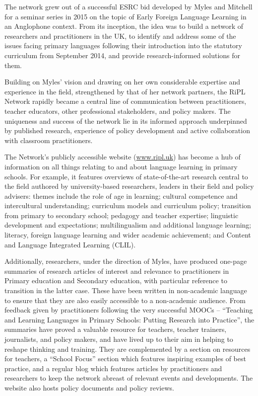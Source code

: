 \documentclass[output=paper]{langscibook}
\begin{document}
The network grew out of a successful ESRC bid developed by Myles and Mitchell for a seminar series in 2015 on the topic of Early Foreign Language Learning in an Anglophone context. From its inception, the idea was to build a network of researchers and practitioners in the UK, to identify and address some of the issues facing primary languages following their introduction into the statutory curriculum from September 2014, and provide research-informed solutions for them. 

Building on Myles’ vision and drawing on her own considerable expertise and experience in the field, strengthened by that of her network partners, the RiPL Network rapidly became a central line of communication between practitioners, teacher educators, other professional stakeholders, and policy makers. The uniqueness and success of the network lie in its informed approach underpinned by published research, experience of policy development and active collaboration with classroom practitioners. 

The Network’s publicly accessible website (\href{http://www.ripl.uk/}{www.ripl.uk}) has become a hub of information on all things relating to and about language learning in primary schools. For example, it features overviews of state-of-the-art research central to the field authored by university-based researchers, leaders in their field and policy advisers: themes include the role of age in learning; cultural competence and intercultural understanding; curriculum models and curriculum policy; transition from primary to secondary school; pedagogy and teacher expertise; linguistic development and expectations; multilingualism and additional language learning; literacy, foreign language learning and wider academic achievement; and Content and Language Integrated Learning (CLIL). 

Additionally, researchers, under the direction of Myles, have produced one-page summaries of research articles of interest and relevance to practitioners in Primary education and Secondary education, with particular reference to transition in the latter case. These have been written in non-academic language to ensure that they are also easily accessible to a non-academic audience. From feedback given by practitioners following the very successful MOOCs -- ``Teaching and Learning Languages in Primary Schools: Putting Research into Practice'', the summaries have proved a valuable resource for teachers, teacher trainers, journalists, and policy makers, and have lived up to their aim in helping to reshape thinking and training. They are complemented by a section on resources for teachers, a ``School Focus'' section which features inspiring examples of best practice, and a regular blog which features articles by practitioners and researchers to keep the network abreast of relevant events and developments. The website also hosts policy documents and policy reviews.
\end{document}
